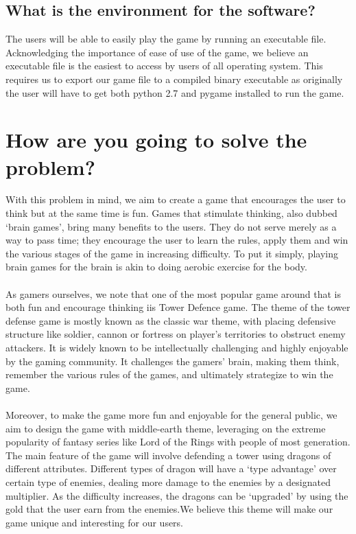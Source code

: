 \documentclass[12pt]{article}
\begin{document}
    \subsection {What is the environment for the software?}
    The users will be able to easily play the game by running an executable file. Acknowledging the importance of ease of use of the game, we believe an executable file is the easiest to access by users of all operating system. This requires us to export our game file to a compiled binary executable as originally the user will have to get both python 2.7 and pygame installed to run the game.

\section{How are you going to solve the problem?}
With this problem  in mind, we aim to create a game that encourages the user to think but at the same time is fun. Games that stimulate thinking, also dubbed ‘brain games’, bring many benefits to the users. They do not serve merely as a way to pass time; they encourage the user to learn the rules, apply them and win the various stages of the game in increasing difficulty. To put it simply, playing brain games for the brain is akin to doing aerobic exercise for the body.\\\\As gamers ourselves, we note that one of the most popular game around that is both fun and encourage thinking iis Tower Defence game. The theme of the tower defense game is mostly known as the classic war theme, with placing defensive structure like soldier, cannon or fortress on player’s territories to obstruct enemy attackers. It is widely known to be intellectually challenging and highly enjoyable by the gaming community. It challenges the gamers’ brain, making them think, remember the various rules of the games, and ultimately strategize to win the game.\\\\Moreover, to make the game more fun and enjoyable for the general public, we aim to design the game with middle-earth theme, leveraging on the extreme popularity of fantasy series like Lord of the Rings with people of most generation. The main feature of the game will involve defending a tower using dragons of different attributes. Different types of dragon will have a ‘type advantage’ over certain type of enemies, dealing more damage to the enemies by a designated multiplier. As the difficulty increases, the dragons can be ‘upgraded’ by using the gold that the user earn from the enemies.We believe this theme will make our game unique and interesting for our users.
\end{document}
